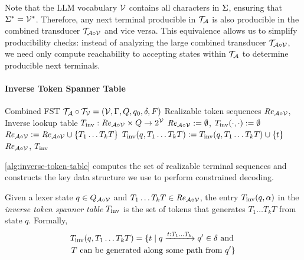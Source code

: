Note that the LLM vocabulary $\mathcal{V}$ contains all characters in $\Sigma$, ensuring that $\Sigma^\ast = \mathcal{V}^\ast$. 
Therefore, any next terminal producible in $\mathcal{T}_{\mathcal{A}}$ is also producible in the combined transducer $\mathcal{T}_{\mathcal{A} \circ \mathcal{V}}$ and vice versa. 
This equivalence allows us to simplify producibility checks: instead of analyzing the large combined transducer $\mathcal{T}_{\mathcal{A} \circ \mathcal{V}}$, we need only compute reachability to accepting states within $\mathcal{T}_{\mathcal{A}}$ to determine producible next terminals.

\paragraph{Inverse Token Spanner Table}
\setcounter{algorithm}{3}
% 
\begin{algorithm}[!t]
\caption{}
\label{alg:inverse-token-table}
\begin{algorithmic}
     Combined FST $\mathcal{T}_{\mathcal{A}} \circ \mathcal{T}_{\mathcal{V}} = (\mathcal{V}, \Gamma, Q, q_0, \delta, F)$
     Realizable token sequences $\mathit{Re}_{\mathcal{A} \circ \mathcal{V}}$, \\
    Inverse lookup table $T_{\textrm{inv}}: \mathit{Re}_{\mathcal{A} \circ \mathcal{V}} \times Q \rightarrow 2^{\mathcal{V}} $
    \STATE $\mathit{Re}_{\mathcal{A} \circ \mathcal{V}} := \emptyset$, $T_{\textrm{inv}}(\cdot, \cdot) := \emptyset$
            \STATE $\mathit{Re}_{\mathcal{A} \circ \mathcal{V}} := \mathit{Re}_{\mathcal{A} \circ \mathcal{V}} \cup \{ T_1 \ldots T_k T \}$
            \STATE $T_{\textrm{inv}}(q, T_1 \ldots T_k T) := T_{\textrm{inv}}(q, T_1 \ldots T_k T) \cup \{t\}$
        \ENDFOR
    \ENDFOR
    \RETURN $\mathit{Re}_{\mathcal{A} \circ \mathcal{V}}$, $T_{\textrm{inv}}$
\end{algorithmic}
\end{algorithm}

\autoref{alg:inverse-token-table} computes the set of realizable terminal sequences and constructs the key data structure we use to perform constrained decoding.
\begin{definition}
Given a lexer state $q \in Q_{\mathcal{A} \circ \mathcal{V}}$ and $T_1 \ldots T_k T \in \mathit{Re}_{\mathcal{A} \circ \mathcal{V}}$, the entry $T_{\textrm{inv}}(q, \alpha)$ in the \textit{inverse token spanner table} $T_{\textrm{inv}}$ is the set of tokens that generates $T_1 \ldots T_kT$ from state $q$. Formally,
\begin{multline*}
T_{\textrm{inv}}(q, T_1 \ldots T_k T) = \{ t \mid q \xrightarrow{t:T_1 \ldots T_k} q' \in \delta \textrm{ and } \\
T \textrm{ can be generated along some path from } q' \}
\end{multline*}    
\end{definition}

